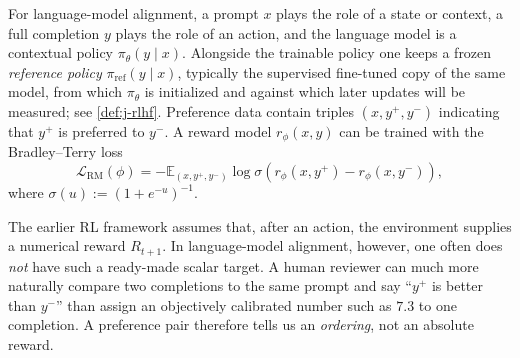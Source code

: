\documentclass[11pt,a4paper]{article}
\theoremstyle{definition}
\begin{document}
For language-model alignment, a prompt $x$ plays the role of a state or context, a full
completion $y$ plays the role of an action, and the language model is a contextual policy
$\pi_\theta(y\mid x)$. Alongside the trainable policy one keeps a frozen
\emph{reference policy} $\pi_{\mathrm{ref}}(y\mid x)$, typically the supervised
fine-tuned copy of the same model, from which $\pi_\theta$ is initialized and against
which later updates will be measured; see \cref{def:j-rlhf}. Preference data contain
triples $(x,y^+,y^-)$ indicating that $y^+$ is preferred to $y^-$. A reward model
$r_\phi(x,y)$ can be trained with the Bradley--Terry loss
\[
\mathcal{L}_{\mathrm{RM}}(\phi)
=-\mathbb{E}_{(x,y^+,y^-)}
\log\sigma\!\left(r_\phi(x,y^+)-r_\phi(x,y^-)\right),
\]
where $\sigma(u):=(1+e^{-u})^{-1}$.

\begin{remark}\label{rem:rm-bt}
The earlier RL framework assumes that, after an action, the environment supplies a numerical
reward $R_{t+1}$. In language-model alignment, however, one often does \emph{not} have such a
ready-made scalar target. A human reviewer can much more naturally compare two completions to
the same prompt and say ``$y^+$ is better than $y^-$'' than assign an objectively calibrated
number such as $7.3$ to one completion. A preference pair therefore tells us an \emph{ordering},
not an absolute reward.


\end{remark}
\end{document}

